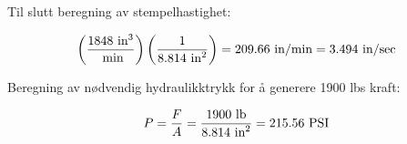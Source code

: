 \vskip 10pt

Til slutt beregning av stempelhastighet:

$$\left(1848 \hbox{ in}^3 \over \hbox{ min} \right) \left(1 \over 8.814 \hbox{ in}^2 \right) = 209.66 \hbox{ in/min} = 3.494 \hbox{ in/sec}$$

\vskip 10pt

Beregning av nødvendig hydraulikktrykk for å generere 1900 lbs kraft:

$$P = {F \over A} = {1900 \hbox{ lb} \over 8.814 \hbox{ in}^2} = 215.56 \hbox{ PSI}$$











